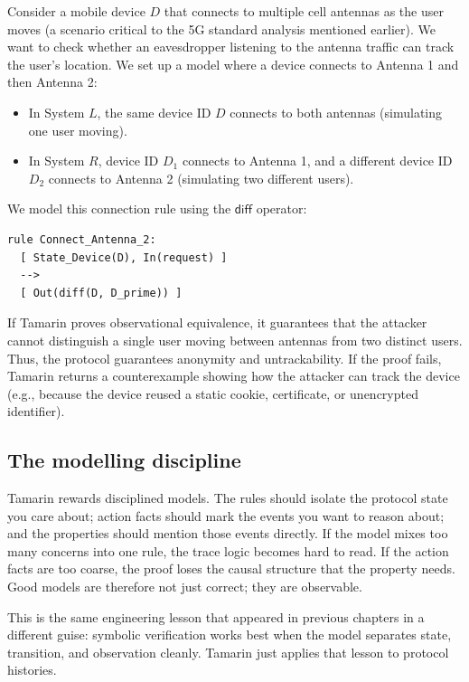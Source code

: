 \begin{example}
Consider a mobile device $D$ that connects to multiple cell antennas as the user moves (a scenario critical to the 5G standard analysis mentioned earlier). We want to check whether an eavesdropper listening to the antenna traffic can track the user's location.
We set up a model where a device connects to Antenna 1 and then Antenna 2:
\begin{itemize}
  \item In System $L$, the same device ID $D$ connects to both antennas (simulating one user moving).
  \item In System $R$, device ID $D_1$ connects to Antenna 1, and a different device ID $D_2$ connects to Antenna 2 (simulating two different users).
\end{itemize}
We model this connection rule using the $\mathsf{diff}$ operator:
\begin{lstlisting}
rule Connect_Antenna_2:
  [ State_Device(D), In(request) ]
  -->
  [ Out(diff(D, D_prime)) ]
\end{lstlisting}
If Tamarin proves observational equivalence, it guarantees that the attacker cannot distinguish a single user moving between antennas from two distinct users. Thus, the protocol guarantees anonymity and untrackability. If the proof fails, Tamarin returns a counterexample showing how the attacker can track the device (e.g., because the device reused a static cookie, certificate, or unencrypted identifier).
\end{example}

\subsection{The modelling discipline}

Tamarin rewards disciplined models.  The rules should isolate the protocol
state you care about; action facts should mark the events you want to reason
about; and the properties should mention those events directly.  If the model
mixes too many concerns into one rule, the trace logic becomes hard to read.
If the action facts are too coarse, the proof loses the causal structure that
the property needs.  Good models are therefore not just correct; they are
observable.

This is the same engineering lesson that appeared in previous chapters in a
different guise: symbolic verification works best when the model separates
state, transition, and observation cleanly.  Tamarin just applies that lesson
to protocol histories.

